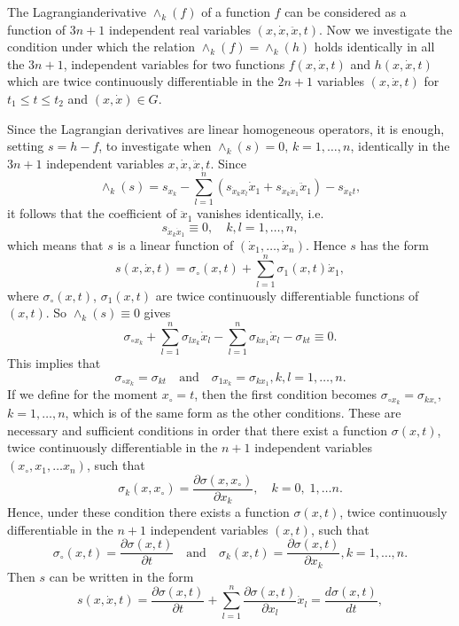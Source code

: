 The Lagrangian\pageoriginale derivative $\wedge_k(f)$ of a function $f$ can be considered as a function of $3n+1$  independent real variables $(x, \dot{x}, \ddot{x},t)$. Now we investigate the condition under which the relation $\wedge_k(f) = \wedge_k(h)$ holds identically in all the $3n+1$, independent variables for two functions $f(x, \dot{x},t)$ and $h(x,\dot{x},t)$ which are twice continuously differentiable in the $2n+1$ variables $(x, \dot{x},t)$ for $t_1 \leq t \leq t_2$ and $(x,\dot{x}) \in G$.

Since the Lagrangian derivatives are linear homogeneous operators, it is enough, setting $s = h -f$, to investigate when  $\wedge_k(s) = 0$, $k = 1, \ldots, n$, identically in the $3n+1$ independent variables $x, \dot{x}, \ddot{x},t$. Since
$$
\wedge_k(s) = s_{x_k} - \sum\limits^n_{l=1} (s_{\dot{x}_k x_l} \dot{x}_1+ s_{\dot{x}_k \dot{x}_1} \ddot{x}_1) - s_{\dot{x}_kt},
$$
it follows that the coefficient of $\ddot{x}_1$ vanishes identically, i.e.
$$
s_{\dot{x}_k \dot{x}_1} \equiv 0, \quad k, l = 1, \ldots, n,
$$
which means that $s$ is a linear function of $(\dot{x}_1, \ldots, \dot{x}_n)$. Hence $s$ has the form
$$
s(x, \dot{x},t) = \sigma_\circ (x,t) + \sum\limits^n_{l=1} \sigma_1 (x,t) \dot{x}_1, 
$$
where $\sigma_\circ (x,t)$, $\sigma_1(x,t)$ are twice continuously differentiable functions of $(x,t)$. So $\wedge_k (s) \equiv 0$ gives
$$
\sigma_{\circ  x_k} + \sum\limits^n_{l=1} \sigma_{lx_k} \dot{x}_l - \sum\limits^n_{l=1} \sigma_{kx_1} \dot{x}_l - \sigma_{kt} \equiv 0.
$$
This implies that\pageoriginale
$$
\sigma_{\circ x_k} = \sigma_{kt} \quad \text{and}\quad \sigma_{1 x_k} = \sigma_{kx_1}, k,l = 1,\ldots, n.
$$
If we define for the moment $x_\circ  =t$, then the first condition becomes $\sigma_{\circ x_k} = \sigma_{kx_\circ}$, $k=1, \ldots, n$, which is of the same form as the other conditions. These are necessary and sufficient conditions in order that there exist a function $\sigma (x,t)$, twice continuously differentiable in the $n+1$ independent variables $(x_\circ, x_1 , \ldots x_n)$, such that
$$
\sigma_k(x,x_\circ) = \frac{\partial \sigma (x,x_\circ)}{\partial x_k}, \quad k = 0, \; 1, \ldots n.
$$
Hence, under these condition there exists a function $\sigma (x,t)$, twice continuously differentiable in the $n+1$ independent variables $(x,t)$, such that 
$$
\sigma_\circ (x,t) = \frac{\partial \sigma(x,t)}{\partial t} \quad \text{and}\quad \sigma_k(x,t) = \frac{\partial \sigma (x,t)}{\partial x_k} , k = 1, \ldots, n.
$$
Then $s$ can be written in the form
$$
s(x, \dot{x}, t) = \frac{\partial \sigma (x,t)}{\partial t} + \sum\limits^n_{l=1} \frac{\partial \sigma(x,t)}{\partial x_l} \dot{x}_l = \frac{d\sigma (x,t)}{dt},
$$
